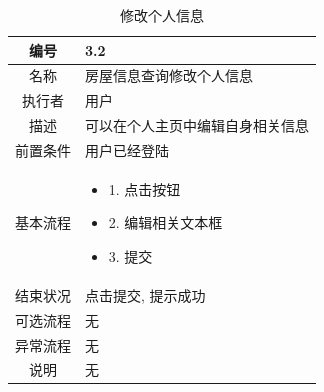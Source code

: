 \begin{table}[htbp]
	\centering
	\begin{tabular}{|c|p{11cm}|}
        \hline
        编号 & 3.2 \\
        \hline
        名称 & 房屋信息查询修改个人信息 \\ 
        \hline
        执行者 &用户 \\
        \hline
        描述 & 可以在个人主页中编辑自身相关信息        \\
        \hline
        前置条件 & 用户已经登陆 \\
        \hline
        基本流程 & \begin{itemize}
            \item 1. 点击按钮
            \item 2. 编辑相关文本框
            \item  3. 提交
        \end{itemize} \\
        \hline
        结束状况 & 点击提交, 提示成功 \\
        \hline
        可选流程 & 无 \\
        \hline
        异常流程 & 无 \\
        \hline
        说明 & 无 \\
        \hline
    \end{tabular}
    \caption{修改个人信息}
\end{table}

